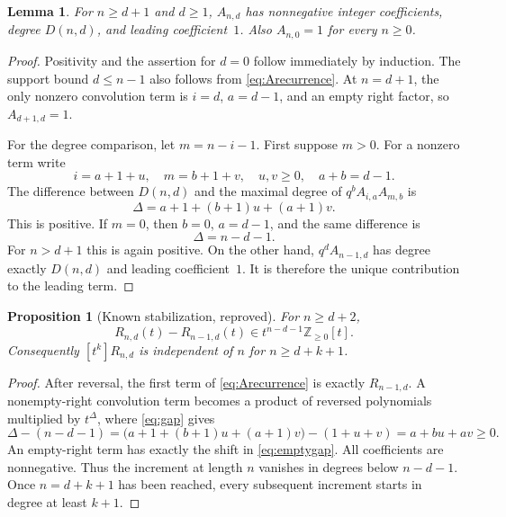 \documentclass[11pt,letterpaper]{article}
\numberwithin{equation}{section}
\newtheorem{proposition}[theorem]{Proposition}
\newtheorem{lemma}[theorem]{Lemma}
\theoremstyle{definition}
\theoremstyle{remark}
\newcommand{\Z}{\mathbb Z}
\begin{document}
\begin{lemma}\label{lem:degree}
For $n\ge d+1$ and $d\ge1$, $A_{n,d}$ has nonnegative integer
coefficients, degree $D(n,d)$, and leading coefficient~$1$.
Also $A_{n,0}=1$ for every $n\ge0$.
\end{lemma}
\begin{proof}
Positivity and the assertion for $d=0$ follow immediately by induction.
The support bound $d\le n-1$ also follows from \eqref{eq:Arecurrence}.
At $n=d+1$, the only nonzero convolution term is
$i=d$, $a=d-1$, and an empty right factor, so $A_{d+1,d}=1$.

For the degree comparison, let $m=n-i-1$. First suppose $m>0$.
For a nonzero term write
\[
 i=a+1+u,\quad m=b+1+v,\quad u,v\ge0,\quad a+b=d-1.
\]
The difference between $D(n,d)$ and the maximal degree of
$q^bA_{i,a}A_{m,b}$ is
\begin{equation}\label{eq:gap}
 \Delta=a+1+(b+1)u+(a+1)v.
\end{equation}
This is positive. If $m=0$, then $b=0$, $a=d-1$, and the same difference is
\begin{equation}\label{eq:emptygap}
 \Delta=n-d-1.
\end{equation}
For $n>d+1$ this is again positive. On the other hand,
$q^dA_{n-1,d}$ has degree exactly $D(n,d)$ and leading coefficient~$1$.
It is therefore the unique contribution to the leading term.
\end{proof}

\begin{proposition}[Known stabilization, reproved]\label{prop:stabilization}
For $n\ge d+2$,
\begin{equation}\label{eq:stabilization}
 R_{n,d}(t)-R_{n-1,d}(t)\in t^{n-d-1}\Z_{\ge0}[t].
\end{equation}
Consequently $[t^k]R_{n,d}$ is independent of $n$ for $n\ge d+k+1$.
\end{proposition}
\begin{proof}
After reversal, the first term of \eqref{eq:Arecurrence} is exactly
$R_{n-1,d}$. A nonempty-right convolution term becomes a product of
reversed polynomials multiplied by $t^\Delta$, where \eqref{eq:gap} gives
\[
 \Delta-(n-d-1)
 =\bigl(a+1+(b+1)u+(a+1)v\bigr)-(1+u+v)
 =a+bu+av\ge0.
\]
An empty-right term has exactly the shift in \eqref{eq:emptygap}.
All coefficients are nonnegative. Thus the increment at length $n$
vanishes in degrees below $n-d-1$. Once $n=d+k+1$ has been reached,
every subsequent increment starts in degree at least $k+1$.
\end{proof}
\end{document}
